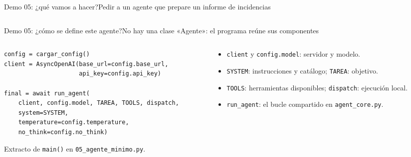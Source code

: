 \begin{frame}{Demo 05: ¿qué vamos a hacer?}{Pedir a un agente que prepare un informe de incidencias}
	\begin{columns}[T]
		\begin{column}{0.31\textwidth}
		\end{column}
		\begin{column}{0.31\textwidth}
		\end{column}
		\begin{column}{0.31\textwidth}
		\end{column}
	\end{columns}
\end{frame}

\begin{frame}[fragile]{Demo 05: ¿cómo se define este agente?}{No hay una clase «Agente»: el programa reúne sus componentes}
	\begin{columns}[T]
		\begin{column}{0.57\textwidth}
			\begin{lstlisting}
config = cargar_config()
client = AsyncOpenAI(base_url=config.base_url,
                     api_key=config.api_key)

final = await run_agent(
    client, config.model, TAREA, TOOLS, dispatch,
    system=SYSTEM,
    temperature=config.temperature,
    no_think=config.no_think)
\end{lstlisting}
			{\scriptsize Extracto de \texttt{main()} en \texttt{05\_agente\_minimo.py}.}
		\end{column}
		\begin{column}{0.41\textwidth}
			\footnotesize
			\begin{itemize}
				\setlength{\itemsep}{1pt}
				\item \texttt{client} y \texttt{config.model}: servidor y modelo.
				\item \texttt{SYSTEM}: instrucciones y catálogo; \texttt{TAREA}: objetivo.
				\item \texttt{TOOLS}: herramientas disponibles; \texttt{dispatch}: ejecución local.
				\item \texttt{run\_agent}: el bucle compartido en \texttt{agent\_core.py}.
			\end{itemize}
		\end{column}
	\end{columns}
\end{frame}

